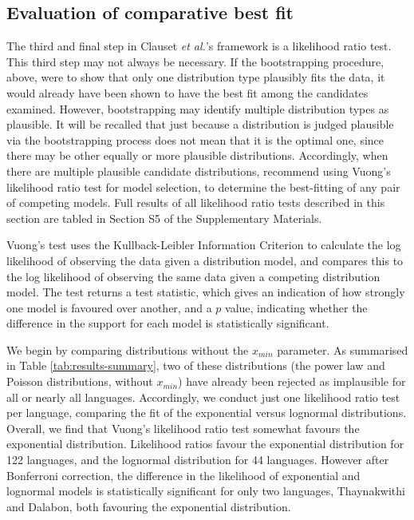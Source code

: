 \hypertarget{evaluation-of-comparative-best-fit}{%
\subsection{Evaluation of comparative best fit}\label{evaluation-of-comparative-best-fit}}

The third and final step in Clauset \emph{et al.}'s \autocite*{clauset_power-law_2009} framework is a likelihood ratio test. This third step may not always be necessary. If the bootstrapping procedure, above, were to show that only one distribution type plausibly fits the data, it would already have been shown to have the best fit among the candidates examined. However, bootstrapping may identify multiple distribution types as plausible. It will be recalled that just because a distribution is judged plausible via the bootstrapping process does not mean that it is the optimal one, since there may be other equally or more plausible distributions. Accordingly, when there are multiple plausible candidate distributions, \textcite{clauset_power-law_2009} recommend using Vuong's \autocite*{vuong_likelihood_1989} likelihood ratio test for model selection, to determine the best-fitting of any pair of competing models. Full results of all likelihood ratio tests described in this section are tabled in Section S5 of the Supplementary Materials.

Vuong's \autocite*{vuong_likelihood_1989} test uses the Kullback-Leibler Information Criterion \autocite{kullback_information_1951} to calculate the log likelihood of observing the data given a distribution model, and compares this to the log likelihood of observing the same data given a competing distribution model. The test returns a test statistic, which gives an indication of how strongly one model is favoured over another, and a \(p\) value, indicating whether the difference in the support for each model is statistically significant.

We begin by comparing distributions without the \(x_{min}\) parameter. As summarised in Table \ref{tab:results-summary}, two of these distributions (the power law and Poisson distributions, without \(x_{min}\)) have already been rejected as implausible for all or nearly all languages. Accordingly, we conduct just one likelihood ratio test per language, comparing the fit of the exponential versus lognormal distributions. Overall, we find that Vuong's likelihood ratio test somewhat favours the exponential distribution. Likelihood ratios favour the exponential distribution for 122 languages, and the lognormal distribution for 44 languages. However after Bonferroni correction, the difference in the likelihood of exponential and lognormal models is statistically significant for only two languages, Thaynakwithi and Dalabon, both favouring the exponential distribution.

